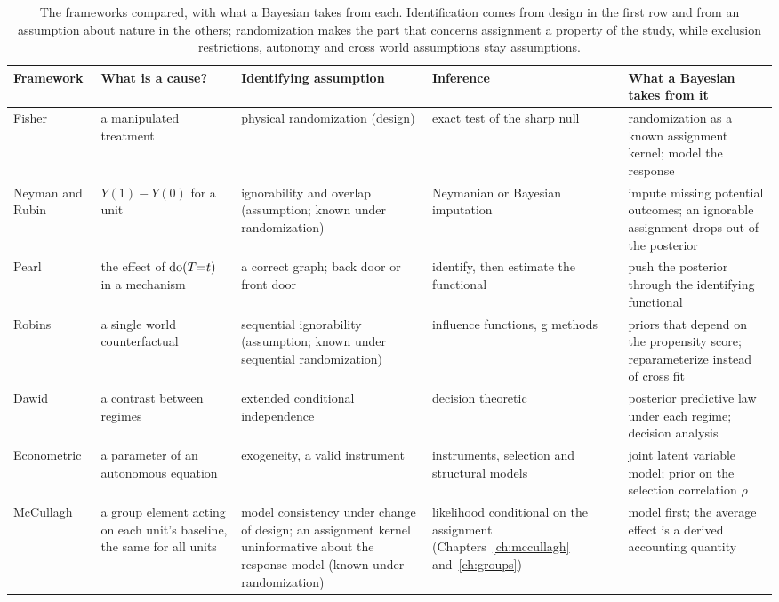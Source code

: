 \begin{table}[htbp]
\centering\footnotesize
\renewcommand{\arraystretch}{1.25}
\begin{tabular}{@{}L{0.7in}L{0.85in}L{1.0in}L{0.8in}L{1.15in}@{}}
\toprule
Framework & What is a cause? & Identifying assumption & Inference & What a Bayesian takes from it \\
\midrule
Fisher & a manipulated treatment & physical randomization (design) & exact test of the sharp null & randomization as a known assignment kernel; model the response \\
Neyman and Rubin & $Y(1)-Y(0)$ for a unit & ignorability and overlap (assumption; known under randomization) & Neymanian or Bayesian imputation & impute missing potential outcomes; an ignorable assignment drops out of the posterior \\
Pearl & the effect of $\mathrm{do}(T{=}t)$ in a mechanism & a correct graph; back door or front door & identify, then estimate the functional & push the posterior through the identifying functional \\
Robins & a single world counterfactual & sequential ignorability (assumption; known under sequential randomization) & influence functions, g methods & priors that depend on the propensity score; reparameterize instead of cross fit \\
Dawid & a contrast between regimes & extended conditional independence & decision theoretic & posterior predictive law under each regime; decision analysis \\
Econometric & a parameter of an autonomous equation & exogeneity, a valid instrument & instruments, selection and structural models & joint latent variable model; prior on the selection correlation $\rho$ \\
McCullagh & a group element acting on each unit's baseline, the same for all units & model consistency under change of design; an assignment kernel uninformative about the response model (known under randomization) & likelihood conditional on the assignment (Chapters~\ref{ch:mccullagh} and~\ref{ch:groups}) & model first; the average effect is a derived accounting quantity \\
\bottomrule
\end{tabular}
\caption{The frameworks compared, with what a Bayesian takes from each. Identification comes from design in the first row and from an assumption about nature in the others; randomization makes the part that concerns assignment a property of the study, while exclusion restrictions, autonomy and cross world assumptions stay assumptions.}
\label{fw:tab:compare}
\end{table}



